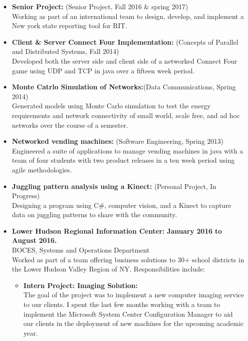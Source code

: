 \documentclass[10pt]{article}
\begin{document}
\begin{itemize}[topsep=1ex, itemsep=1ex, partopsep=0ex, parsep=.25ex]
		\item[] {\bf Senior Project:} (Senior Project, Fall 2016 \& spring 2017)\\
		Working as part of an international team to design, develop, and implement a New york state reporting tool for RIT.	
    	\item[] {\bf Client \& Server Connect Four Implementation:} (Concepts of Parallel and Distributed Systems, Fall 2014)\\
    	Developed both the server side and client side of a networked Connect Four game using UDP and TCP in java over a fifteen week period.
	\item[] {\bf Monte Catrlo Simulation of Networks:}(Data Communications, Spring 2014)\\
	Generated models using Monte Carlo simulation to test the energy requirements and network connectivity of small world, scale free, and ad hoc networks over the course of a semester.
	\item[] {\bf Networked vending machines:} (Software Engineering, Spring 2013)\\
	Engineered a suite of applications to manage vending machines in java with a team of four students with two product releases in a ten week period using agile methodologies.
	\item[] {\bf Juggling pattern analysis using a Kinect:} (Personal Project, In Progress)\\
    	Designing a program using C\#, computer vision, and a Kinect to capture data on juggling patterns to share with the community.
\end{itemize}
\vspace{.75ex}
\begin{itemize}[topsep=1ex, itemsep=1ex, partopsep=0ex, parsep=.25ex]
	\item[] {{\bf Lower Hudson Regional Information Center:} \hfill {\bf January 2016 to August 2016.}}\\
	BOCES, Systems and Operations Department\\
	Worked as part of a team offering business solutions to 30+ school districts in the Lower Hudson Valley Region of NY. Responsibilities include:
	\begin{itemize} [topsep=.5ex, itemsep=.25ex, partopsep=0ex, parsep=.5ex]
		\item[] {\bf Intern Project: Imaging Solution:}\\
		The goal of the project was to implement a new computer imaging service to our clients. I spent the last few months working with a team to implement the Microsoft System Center Configuration Manager to aid our clients in the deployment of new machines for the upcoming academic year. 
	\end{itemize}
\end{itemize}
\end{document}
